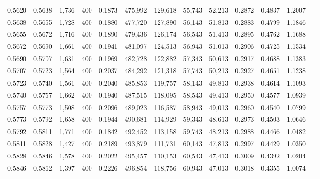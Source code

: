 \begin{tabular}{rrrrrrrrrrrrr}
0.5620 & 0.5638 &  1,736 & 400 &                                     0.1873 & 475,992 & 129,618 &  55,743 &  52,213 & 0.2872 & 0.4837 & 1.2007 \\
0.5638 & 0.5655 &  1,728 & 400 &                                     0.1880 & 477,720 & 127,890 &  56,143 &  51,813 & 0.2883 & 0.4799 & 1.1846 \\
0.5655 & 0.5672 &  1,716 & 400 &                                     0.1890 & 479,436 & 126,174 &  56,543 &  51,413 & 0.2895 & 0.4762 & 1.1688 \\
0.5672 & 0.5690 &  1,661 & 400 &                                     0.1941 & 481,097 & 124,513 &  56,943 &  51,013 & 0.2906 & 0.4725 & 1.1534 \\
0.5690 & 0.5707 &  1,631 & 400 &                                     0.1969 & 482,728 & 122,882 &  57,343 &  50,613 & 0.2917 & 0.4688 & 1.1383 \\
0.5707 & 0.5723 &  1,564 & 400 &                                     0.2037 & 484,292 & 121,318 &  57,743 &  50,213 & 0.2927 & 0.4651 & 1.1238 \\
0.5723 & 0.5740 &  1,561 & 400 &                                     0.2040 & 485,853 & 119,757 &  58,143 &  49,813 & 0.2938 & 0.4614 & 1.1093 \\
0.5740 & 0.5757 &  1,662 & 400 &                                     0.1940 & 487,515 & 118,095 &  58,543 &  49,413 & 0.2950 & 0.4577 & 1.0939 \\
0.5757 & 0.5773 &  1,508 & 400 &                                     0.2096 & 489,023 & 116,587 &  58,943 &  49,013 & 0.2960 & 0.4540 & 1.0799 \\
0.5773 & 0.5792 &  1,658 & 400 &                                     0.1944 & 490,681 & 114,929 &  59,343 &  48,613 & 0.2973 & 0.4503 & 1.0646 \\
0.5792 & 0.5811 &  1,771 & 400 &                                     0.1842 & 492,452 & 113,158 &  59,743 &  48,213 & 0.2988 & 0.4466 & 1.0482 \\
0.5811 & 0.5828 &  1,427 & 400 &                                     0.2189 & 493,879 & 111,731 &  60,143 &  47,813 & 0.2997 & 0.4429 & 1.0350 \\
0.5828 & 0.5846 &  1,578 & 400 &                                     0.2022 & 495,457 & 110,153 &  60,543 &  47,413 & 0.3009 & 0.4392 & 1.0204 \\
0.5846 & 0.5862 &  1,397 & 400 &                                     0.2226 & 496,854 & 108,756 &  60,943 &  47,013 & 0.3018 & 0.4355 & 1.0074 \\

\end{tabular}

